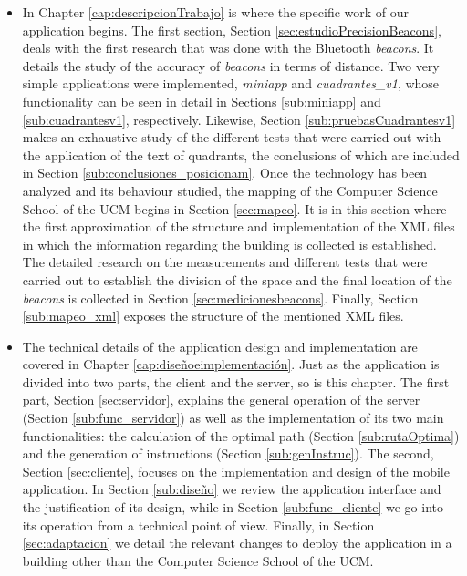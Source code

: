 \begin{itemize}
	\item In Chapter \ref{cap:descripcionTrabajo} is where the specific work of our application begins. The first section, Section \ref{sec:estudioPrecisionBeacons}, deals with the first research that was done with the Bluetooth \textit{beacons}. It details the study of the accuracy of \textit{beacons} in terms of distance. Two very simple applications were implemented, \textit{miniapp} and \textit{cuadrantes\_v1}, whose functionality can be seen in detail in Sections \ref{sub:miniapp} and \ref{sub:cuadrantesv1}, respectively. Likewise, Section \ref{sub:pruebasCuadrantesv1} makes an exhaustive study of the different tests that were carried out with the application of the text of quadrants, the conclusions of which are included in Section \ref{sub:conclusiones_posicionam}. Once the technology has been analyzed and its behaviour studied, the mapping of the Computer Science School of the UCM begins in Section \ref{sec:mapeo}. It is in this section where the first approximation of the structure and implementation of the XML files in which the information regarding the building is collected is established. The detailed research on the measurements and different tests that were carried out to establish the division of the space and the final location of the \textit{beacons} is collected in Section \ref{sec:medicionesbeacons}. Finally, Section \ref{sub:mapeo_xml} exposes the structure of the mentioned XML files.
	
	\item The technical details of the application design and implementation are covered in Chapter \ref{cap:diseñoeimplementación}. Just as the application is divided into two parts, the client and the server, so is this chapter. The first part, Section \ref{sec:servidor}, explains the general operation of the server (Section \ref{sub:func_servidor}) as well as the implementation of its two main functionalities: the calculation of the optimal path (Section \ref{sub:rutaOptima}) and the generation of instructions (Section \ref{sub:genInstruc}). The second, Section \ref{sec:cliente}, focuses on the implementation and design of the mobile application. In Section \ref{sub:diseño} we review the application interface and the justification of its design, while in Section \ref{sub:func_cliente} we go into its operation from a technical point of view. Finally, in Section \ref{sec:adaptacion} we detail the relevant changes to deploy the application in a building other than the Computer Science School of the UCM.
	

\end{itemize}
